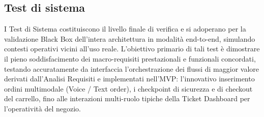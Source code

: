 \documentclass[a4paper,11pt,oneside]{scrartcl}
\begin{document}
\subsection{Test di sistema}
I Test di Sistema costituiscono il livello finale di verifica e si adoperano per la validazione Black Box dell'intera architettura in modalità end-to-end, simulando contesti operativi vicini all'uso reale. L'obiettivo primario di tali test è dimostrare il pieno soddisfacimento dei macro-requisiti prestazionali e funzionali concordati, testando accuratamente da interfaccia l'orchestrazione dei flussi di maggior valore derivati dall'Analisi Requisiti e implementati nell'MVP: l'innovativo inserimento ordini multimodale (Voice / Text order), i checkpoint di sicurezza e di checkout del carrello, fino alle interazioni multi-ruolo tipiche della Ticket Dashboard per l'operatività del negozio.
\end{document}
